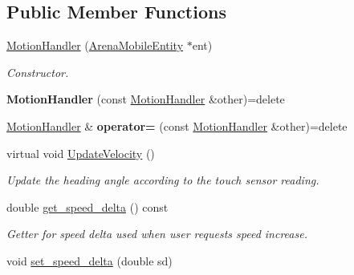 \subsection*{Public Member Functions}
\begin{DoxyCompactItemize}
\item 
\hyperlink{classMotionHandler_a48c0070bfda6acb8a7493eb7fe1200c4}{Motion\+Handler} (\hyperlink{classArenaMobileEntity}{Arena\+Mobile\+Entity} $\ast$ent)\hypertarget{classMotionHandler_a48c0070bfda6acb8a7493eb7fe1200c4}{}\label{classMotionHandler_a48c0070bfda6acb8a7493eb7fe1200c4}

\begin{DoxyCompactList}\small\item\em Constructor. \end{DoxyCompactList}\item 
{\bfseries Motion\+Handler} (const \hyperlink{classMotionHandler}{Motion\+Handler} \&other)=delete\hypertarget{classMotionHandler_ab7f405f862c45aad6768074157cbb675}{}\label{classMotionHandler_ab7f405f862c45aad6768074157cbb675}

\item 
\hyperlink{classMotionHandler}{Motion\+Handler} \& {\bfseries operator=} (const \hyperlink{classMotionHandler}{Motion\+Handler} \&other)=delete\hypertarget{classMotionHandler_aa56903e2a17a6279a4c2be0f00e2a593}{}\label{classMotionHandler_aa56903e2a17a6279a4c2be0f00e2a593}

\item 
virtual void \hyperlink{classMotionHandler_ad9bfac3d0ec3cec1d607f41475886c3c}{Update\+Velocity} ()\hypertarget{classMotionHandler_ad9bfac3d0ec3cec1d607f41475886c3c}{}\label{classMotionHandler_ad9bfac3d0ec3cec1d607f41475886c3c}

\begin{DoxyCompactList}\small\item\em Update the heading angle according to the touch sensor reading. \end{DoxyCompactList}\item 
double \hyperlink{classMotionHandler_a7a9b503e3da267c7af25d58daff5f216}{get\+\_\+speed\+\_\+delta} () const \hypertarget{classMotionHandler_a7a9b503e3da267c7af25d58daff5f216}{}\label{classMotionHandler_a7a9b503e3da267c7af25d58daff5f216}

\begin{DoxyCompactList}\small\item\em Getter for speed delta used when user requests speed increase. \end{DoxyCompactList}\item 
void \hyperlink{classMotionHandler_a908b330346b3fe969684106bd5c7619d}{set\+\_\+speed\+\_\+delta} (double sd)\hypertarget{classMotionHandler_a908b330346b3fe969684106bd5c7619d}{}\label{classMotionHandler_a908b330346b3fe969684106bd5c7619d}


\end{DoxyCompactItemize}
